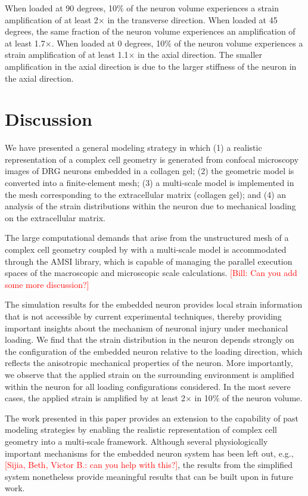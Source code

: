 \documentclass[]{interact}
\newcommand{\red}[1]{\textcolor{red}{[#1]}}
\begin{document}
When loaded at 90 degrees, 10$\%$ of the neuron volume experiences a strain amplification of at least 2$\times$ in the transverse direction. When loaded at 45 degrees, the same fraction of the neuron volume experiences an amplification of at least 1.7$\times$. When loaded at 0 degrees, 10$\%$ of the neuron volume experiences a strain amplification of at least 1.1$\times$ in the axial direction. The smaller amplification in the axial direction is due to the larger stiffness of the neuron in the axial direction. 

\section{Discussion}
\label{sec:discussion}

We have presented a general modeling strategy in which (1) a realistic representation of a complex cell geometry is generated from confocal microscopy images of DRG neurons embedded in a collagen gel; (2) the geometric model is converted into a finite-element mesh; (3) a multi-scale model is implemented in the mesh corresponding to the extracellular matrix (collagen gel); and (4) an analysis of the strain distributions within the neuron due to mechanical loading on the extracellular matrix.

The large computational demands that arise from the unstructured mesh of a complex cell geometry coupled by with a multi-scale model is accommodated through the AMSI library, which is capable of managing the parallel execution spaces of the macroscopic and microscopic scale calculations. \red{Bill: Can you add some more discussion?}

The simulation results for the embedded neuron provides local strain information that is not accessible by current experimental techniques, thereby providing important insights about the mechanism of neuronal injury under mechanical loading. We find that the strain distribution in the neuron depends strongly on the configuration of the embedded neuron relative to the loading direction, which reflects the anisotropic mechanical properties of the neuron. More importantly, we observe that the applied strain on the surrounding environment is amplified within the neuron for all loading configurations considered. In the most severe cases, the applied strain is amplified by at least 2$\times$ in 10$\%$ of the neuron volume. 

The work presented in this paper provides an extension to the capability of past modeling strategies by enabling the realistic representation of complex cell geometry into a multi-scale framework. Although several physiologically important mechanisms for the embedded neuron system has been left out, e.g., \red{Sijia, Beth, Victor B.: can you help with this?}, the results from the simplified system nonetheless provide meaningful results that can be built upon in future work.
\end{document}
